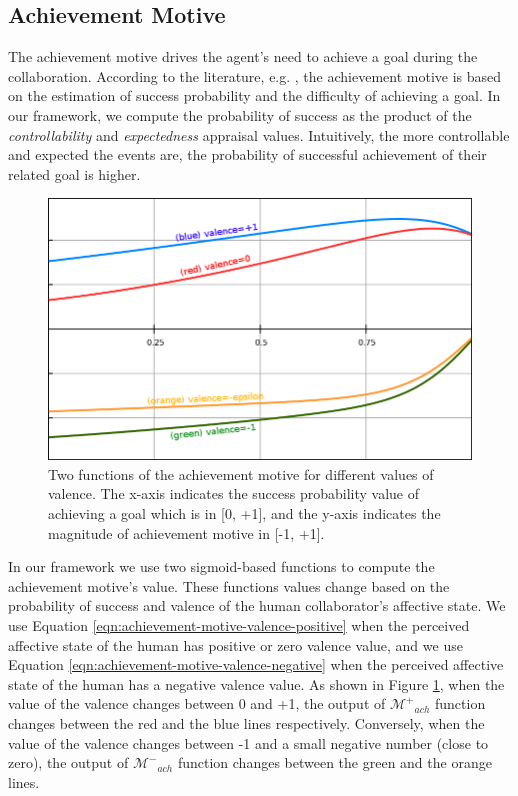 \documentclass[12pt]{report}
\begin{document}
\subsection{Achievement Motive}
The achievement motive drives the agent's need to achieve a goal during the
collaboration. According to the literature, e.g.
\cite{merrick:acheievement-affiliation-power}, the achievement motive is based
on the estimation of success probability and the difficulty of achieving a goal.
In our framework, we compute the probability of success as the product of the
\textit{controllability} and \textit{expectedness} appraisal values.
Intuitively, the more controllable and expected the events are, the probability
of successful achievement of their related goal is higher.

\begin{figure}[t]
  \centering
  \includegraphics[width=1\textwidth]{figure/achievement_motive_functions.png}
  \caption{Two functions of the achievement motive for different values of
  valence. The x-axis indicates the success probability value of achieving a
  goal which is in [0, +1], and the y-axis indicates the magnitude of
  achievement motive in [-1, +1].}
  \label{fig:achievement-motive-functions}
\end{figure}

In our framework we use two sigmoid-based functions to compute the achievement
motive's value. These functions values change based on the probability of
success and valence of the human collaborator's affective state. We use Equation
\ref{eqn:achievement-motive-valence-positive} when the perceived affective state of the
human has positive or zero valence value, and we use Equation
\ref{eqn:achievement-motive-valence-negative} when the perceived affective state
of the human has a negative valence value. As shown in Figure
\ref{fig:achievement-motive-functions}, when the value of the valence changes
between 0 and +1, the output of $\mathcal{M^{+}}_{ach}$ function changes between
the red and the blue lines respectively. Conversely, when the value of the
valence changes between -1 and a small negative number (close to zero), the
output of $\mathcal{M^{-}}_{ach}$ function changes between the green and the
orange lines.
\end{document}
